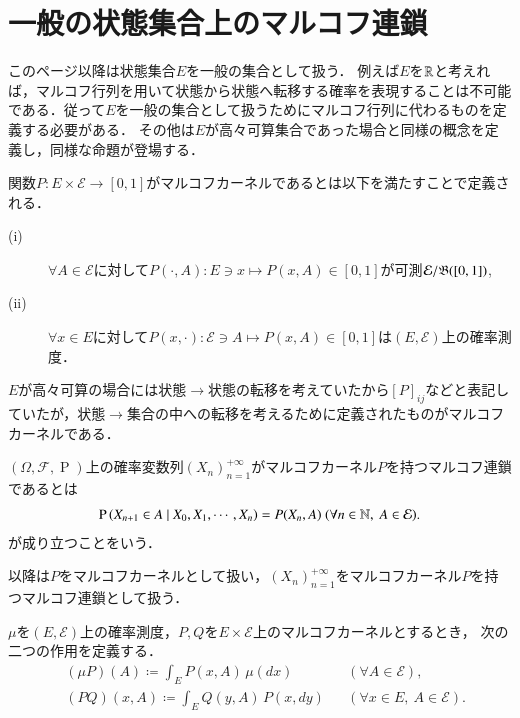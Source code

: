 \newpage
\section{一般の状態集合上のマルコフ連鎖}
	このページ以降は状態集合$E$を一般の集合として扱う．
	例えば$E$を$\mathbb{R}$と考えれば，マルコフ行列を用いて状態から状態へ転移する確率を表現することは不可能である．従って$E$を一般の集合として扱うためにマルコフ行列に代わるものを定義する必要がある．
	その他は$E$が高々可算集合であった場合と同様の概念を定義し，同様な命題が登場する．
	
	\begin{dfn}
		関数$P:E \times \mathcal{E} \longrightarrow [0,1]$がマルコフカーネルであるとは以下を満たすことで定義される．
		\begin{description}
			\item[\rm{(i)}] $\forall A \in \mathcal{E}$に対して$P(\cdot,A):E \ni x \longmapsto P(x,A) \in [0,1]$が可測$\mathcal{E}/\mathfrak{B}([0,1])$,
			\item[\rm{(ii)}] $\forall x \in E$に対して$P(x,\cdot):\mathcal{E} \ni A \longmapsto P(x,A) \in [0,1]$は$(E,\mathcal{E})$上の確率測度．
		\end{description}
	\end{dfn}
	
	$E$が高々可算の場合には状態$\rightarrow$状態の転移を考えていたから$[P]_{ij}$などと表記していたが，状態$\rightarrow$集合の中への転移を考えるために定義されたものがマルコフカーネルである．
	
	\begin{dfn}[マルコフ連鎖]
		$(\Omega,\mathcal{F},\operatorname{P})$上の確率変数列$(X_n)_{n=1}^{+\infty}$がマルコフカーネル$P$を持つマルコフ連鎖であるとは
		\begin{align}
			\cprob{X_{n+1} \in A}{X_0,X_1,\cdots,X_n} = P(X_n,A)\ (\forall n \in \N,\ A \in \mathcal{E}).
		\end{align}
		が成り立つことをいう．
	\end{dfn}
	
	以降は$P$をマルコフカーネルとして扱い，$(X_n)_{n=1}^{+\infty}$をマルコフカーネル$P$を持つマルコフ連鎖として扱う．
	
	\begin{dfn}[作用の定義]
		$\mu$を$(E,\mathcal{E})$上の確率測度，$P,Q$を$E \times \mathcal{E}$上のマルコフカーネルとするとき，
		次の二つの作用を定義する．
		\begin{align}
			& (\mu P)(A) \coloneqq \int_{E} P(x,A)\, \mu(dx) && (\forall A \in \mathcal{E}), \\
			& (PQ) (x,A) \coloneqq \int_{E} Q(y,A)\, P(x, dy) && (\forall x \in E,\ A \in \mathcal{E}).
		\end{align}
	\end{dfn}
	
